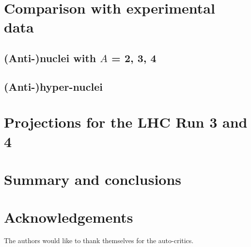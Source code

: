\documentclass[a4paper,11pt]{scrartcl} %
\begin{document}
\section{Comparison with experimental data}

\subsection{(Anti-)nuclei with $A$ = 2, 3, 4}

\subsection{(Anti-)hyper-nuclei}

\section{Projections for the LHC Run 3 and 4}

\section{Summary and conclusions}


\newenvironment{acknowledgement}{\relax}{\relax}
\begin{acknowledgement}
\section*{Acknowledgements}

The authors would like to thank themselves for the auto-critics.

\end{acknowledgement}




 	

\end{document}
